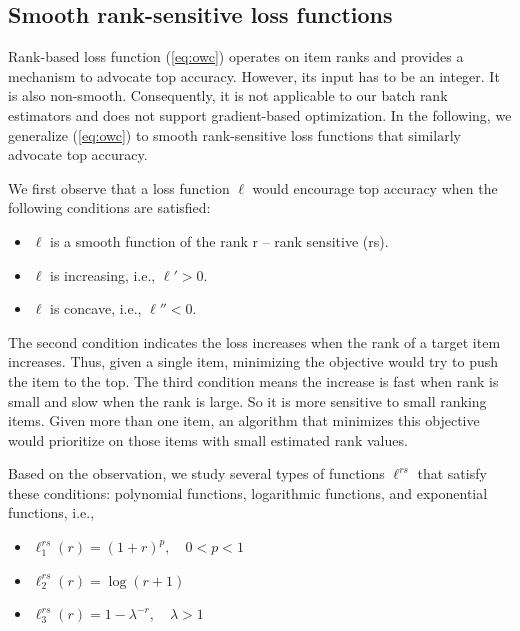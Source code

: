 \documentclass[letterpaper]{article} %
\begin{document}
\subsection{Smooth rank-sensitive loss functions}

Rank-based loss function (\ref{eq:owc}) operates on item ranks and provides a mechanism to advocate top accuracy. However, its input has to be an integer. It is also non-smooth. Consequently, it is not applicable to our batch rank estimators and does not support gradient-based optimization. In the following, we generalize (\ref{eq:owc}) to smooth rank-sensitive loss functions that similarly advocate top accuracy.

We first observe that a loss function $\ell$ would encourage top accuracy when the following conditions are satisfied:
\begin{itemize}
\item $\ell$ is a smooth function of the rank r -- rank sensitive (rs).
\item $\ell$ is increasing, i.e., $\ell' > 0$.
\item $\ell$ is concave, i.e., $\ell'' < 0$.
\end{itemize}

The second condition indicates the loss increases when the rank of a target item increases. Thus, given a single item, minimizing the objective would try to push the item to the top. The third condition means the increase is fast when rank is small and slow when the rank is large. So it is more sensitive to small ranking items. Given more than one item, an algorithm that minimizes this objective would prioritize on those items with small estimated rank values.

Based on the observation, we study several types of functions $\ell^{rs}$ that satisfy these conditions: polynomial functions, logarithmic functions, and exponential functions, i.e.,
\begin{itemize}
\item $\ell_1^{rs}(r) = (1+r)^p, \quad 0<p<1$
\item $\ell_2^{rs}(r) = \log(r+1)$
\item $\ell_3^{rs}(r) = 1 - \lambda^{-r}, \quad \lambda > 1$
\end{itemize}
\end{document}
